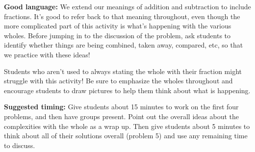 \documentclass[nooutcomes,noauthor]{ximera}
\begin{document}
\begin{instructorNotes}
{\bf Good language:}  We extend our meanings of addition and subtraction to include fractions. It's good to refer back to that meaning throughout, even though the more complicated part of this activity is what's happening with the various wholes. Before jumping in to the discussion of the problem, ask students to identify whether things are being combined, taken away, compared, etc, so that we practice with these ideas!

Students who aren't used to always stating the whole with their fraction might struggle with this activity! Be sure to emphasize the wholes throughout and encourage students to draw pictures to help them think about what is happening.




{\bf Suggested timing:} Give students about 15 minutes to work on the first four problems, and then have groups present. Point out the overall ideas about the complexities with the whole as a wrap up. Then give students about 5 minutes to think about all of their solutions overall (problem 5) and use any remaining time to discuss.


\end{instructorNotes}
\end{document}
